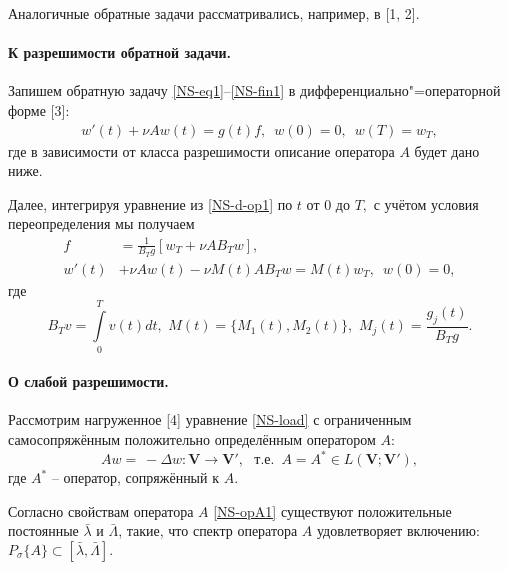 Аналогичные обратные задачи рассматривались, например, в [1, 2].

\paragraph{К разрешимости обратной задачи.}
Запишем обратную задачу \eqref{NS-eq1}--\eqref{NS-fin1} в дифференциально"=операторной форме [3]:
\begin{align} \label{NS-d-op1}
w'(t)+\nu Aw(t)=g(t)f,\,\,\, w(0)=0,\,\,\, w(T)=w_T,
\end{align}
где в зависимости от класса разрешимости описание оператора $A$ будет дано ниже.

Далее, интегрируя уравнение из \eqref{NS-d-op1} по $t$ от $0$ до $T,$ с учётом условия переопределения мы получаем
\begin{align} \label{NS-unk1}
f&=\frac{1}{B_Tg}\left[w_{T}+\nu A B_Tw\right],\\
\label{NS-load}w'(t)&+\nu A w(t)-\nu M(t)A B_Tw
=M(t)w_{T},\,\,\, w(0)=0,
\end{align}
где
\begin{equation}\label{NS-def1}
B_Tv=\int\limits_0^Tv(t)dt,\,\, M(t)=\{M_1(t), M_2(t)\},\,\, M_j\left(t\right)=\frac{g_j\left(t\right)}{B_Tg}.
\end{equation}

\paragraph{О слабой разрешимости.}
Рассмотрим нагруженное [4] уравнение \eqref{NS-load} с ограниченным самосопряжённым положительно определённым оператором $A$:
\begin{equation} \label{NS-opA1}
Aw=\ - \Delta w: \mathbf{V}\to\mathbf{V}',\,\, \textrm{ т.е. }\, A=A^*\in L(\mathbf{V};\mathbf{V}'),
\end{equation}
где $A^*$ -- оператор, сопряжённый к $A.$

Согласно свойствам оператора $A$ \eqref{NS-opA1} существуют положительные постоянные $\bar{\lambda}$ и $\bar{\Lambda}$, такие, что спектр оператора $A$ удовлетворяет включению: $P_\sigma\{A\}\subset[\bar{\lambda},\bar{\Lambda}].$

